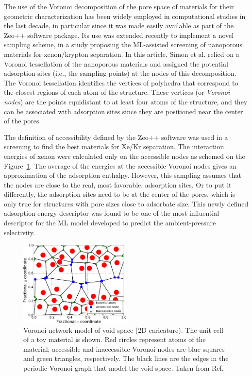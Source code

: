 \documentclass[main]{subfiles}
\begin{document}
The use of the Voronoi decomposition of the pore space of materials for their geometric characterization has been widely employed in computational studies in the last decade,\cite{Willems_2012} in particular since it was made easily available as part of the Zeo++ software package.\cite{Pinheiro2013} Its use was extended recently to implement a novel sampling scheme, in a study proposing the ML-assisted screening of nanoporous materials for xenon/krypton separation. In this article, Simon et al.\cite{Simon_2015} relied on a Voronoi tessellation of the nanoporous materials and assigned the potential adsorption sites (i.e., the sampling points) at the nodes of this decomposition. The Voronoi tessellation identifies the vertices of polyhedra that correspond to the closest regions of each atom of the structure. These vertices (or \emph{Voronoi nodes}) are the points equidistant to at least four atoms of the structure, and they can be associated with adsorption sites since they are positioned near the center of the pores. 

The definition of accessibility defined by the Zeo++ software was used in a screening to find the best materials for Xe/Kr separation.\cite{Simon_2015} The interaction energies of xenon were calculated only on the accessible nodes as schemed on the Figure~\ref{fgr:simon_voro}. The average of the energies at the accessible Voronoi nodes gives an approximation of the adsorption enthalpy. However, this sampling assumes that the nodes are close to the real, most favorable, adsorption sites. Or to put it differently, the adsorption sites need to be at the center of the pores, which is only true for structures with pore sizes close to adsorbate size. This newly defined adsorption energy descriptor was found to be one of the most influential descriptor for the ML model developed to predict the ambient-pressure selectivity. 

\begin{figure}[ht]
  \centering
  \includegraphics[width=0.5\textwidth]{figures/3-fastsim/Simon_voronoi.jpeg}
  \caption{Voronoi network model of void space (2D caricature). The unit cell of a toy material is shown. Red circles represent atoms of the material; accessible and inaccessible Voronoi nodes are blue squares and green triangles, respectively. The black lines are the edges in the periodic Voronoi graph that model the void space. Taken from Ref.~\cite{Simon_2015}}\label{fgr:simon_voro}
\end{figure}
\end{document}
